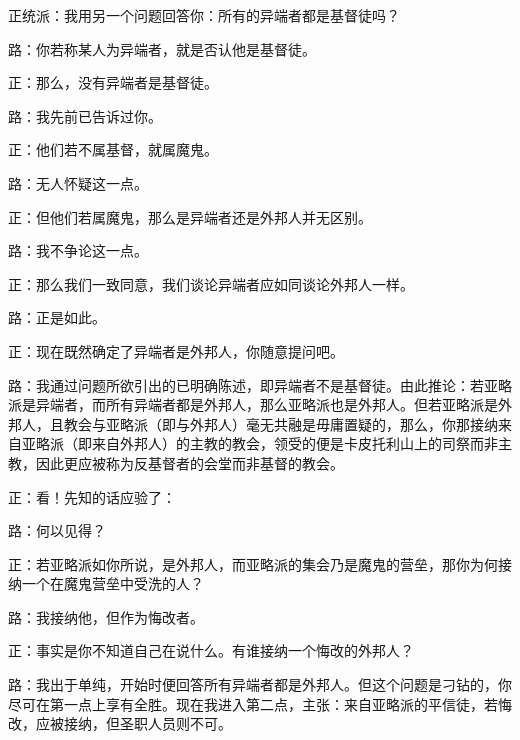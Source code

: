 正统派：我用另一个问题回答你：所有的异端者都是基督徒吗？\par

路：你若称某人为异端者，就是否认他是基督徒。\par

正：那么，没有异端者是基督徒。\par

路：我先前已告诉过你。\par

正：他们若不属基督，就属魔鬼。\par

路：无人怀疑这一点。\par

正：但他们若属魔鬼，那么是异端者还是外邦人并无区别。\par

路：我不争论这一点。\par

正：那么我们一致同意，我们谈论异端者应如同谈论外邦人一样。\par

路：正是如此。\par

正：现在既然确定了异端者是外邦人，你随意提问吧。\par

路：我通过问题所欲引出的已明确陈述，即异端者不是基督徒。由此推论：若亚略派是异端者，而所有异端者都是外邦人，那么亚略派也是外邦人。但若亚略派是外邦人，且教会与亚略派（即与外邦人）毫无共融是毋庸置疑的，那么，你那接纳来自亚略派（即来自外邦人）的主教的教会，领受的便是卡皮托利山上的司祭而非主教，因此更应被称为反基督者的会堂而非基督的教会。\par

正：看！先知的话应验了：\par

路：何以见得？\par

正：若亚略派如你所说，是外邦人，而亚略派的集会乃是魔鬼的营垒，那你为何接纳一个在魔鬼营垒中受洗的人？\par

路：我接纳他，但作为悔改者。\par

正：事实是你不知道自己在说什么。有谁接纳一个悔改的外邦人？\par

路：我出于单纯，开始时便回答所有异端者都是外邦人。但这个问题是刁钻的，你尽可在第一点上享有全胜。现在我进入第二点，主张：来自亚略派的平信徒，若悔改，应被接纳，但圣职人员则不可。\par

